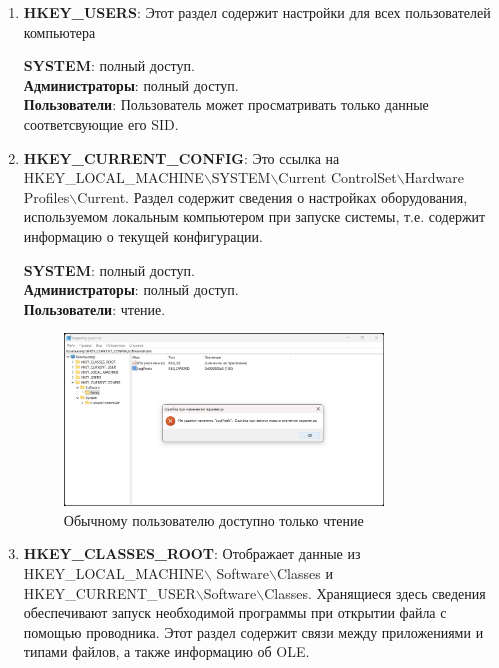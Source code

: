 \documentclass[a4paper, 14pt]{report}
\begin{document}
\begin{enumerate}
{          }
    \item {\textbf{HKEY\_USERS}: Этот раздел содержит настройки для всех пользователей компьютера
          \begin{tcolorbox}[colback=white!95!gray, colframe=black, title=Права доступа]
              \textbf{SYSTEM}: полный доступ.\\
              \textbf{Администраторы}: полный доступ.\\
              \textbf{Пользователи}: Пользователь может просматривать только данные соответсвующие его SID.
          \end{tcolorbox}
          }
    \item {\textbf{HKEY\_CURRENT\_CONFIG}: Это ссылка на HKEY\_LOCAL\_MACHINE$\backslash$SYSTEM$\backslash$Current ControlSet$\backslash$Hardware Profiles$\backslash$Current. Раздел содержит сведения о настройках оборудования, используемом локальным компьютером при запуске системы, т.е. содержит информацию о текущей конфигурации.
          \begin{tcolorbox}[colback=white!95!gray, colframe=black, title=Права доступа]
              \textbf{SYSTEM}: полный доступ.\\
              \textbf{Администраторы}: полный доступ.\\
              \textbf{Пользователи}: чтение.
          \end{tcolorbox}
          \begin{figure}[H]
              \centering
              \includegraphics[width=0.8\textwidth]{../images/HKCC_users.png}
              \caption{Обычному пользователю доступно только чтение}
          \end{figure}
          }
    \item {\textbf{HKEY\_CLASSES\_ROOT}: Отображает данные из HKEY\_LOCAL\_MACHINE$\backslash$ Software$\backslash$Classes и HKEY\_CURRENT\_USER$\backslash$Software$\backslash$Classes. Хранящиеся здесь сведения обеспечивают запуск необходимой программы при открытии файла с помощью проводника. Этот раздел содержит связи между приложениями и типами файлов, а также информацию об OLE.
}
\end{enumerate}
\end{document}

